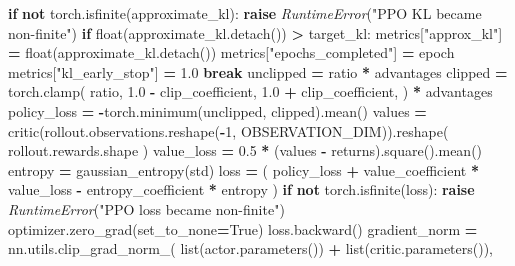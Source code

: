\documentclass[
  american,
  11pt,
  letterpaper,
]{article}
\newenvironment{Shaded}{\begin{snugshade}}{\end{snugshade}}
\newcommand{\BuiltInTok}[1]{#1}
\newcommand{\ControlFlowTok}[1]{\textcolor[rgb]{0.13,0.29,0.53}{\textbf{#1}}}
\newcommand{\DecValTok}[1]{\textcolor[rgb]{0.00,0.00,0.81}{#1}}
\newcommand{\FloatTok}[1]{\textcolor[rgb]{0.00,0.00,0.81}{#1}}
\newcommand{\KeywordTok}[1]{\textcolor[rgb]{0.13,0.29,0.53}{\textbf{#1}}}
\newcommand{\NormalTok}[1]{#1}
\newcommand{\OperatorTok}[1]{\textcolor[rgb]{0.81,0.36,0.00}{\textbf{#1}}}
\newcommand{\PreprocessorTok}[1]{\textcolor[rgb]{0.56,0.35,0.01}{\textit{#1}}}
\newcommand{\StringTok}[1]{\textcolor[rgb]{0.31,0.60,0.02}{#1}}
\newcommand{\VariableTok}[1]{\textcolor[rgb]{0.00,0.00,0.00}{#1}}
\newcounter{none} %
\renewenvironment{Shaded}{\par\smallskip}{\par\smallskip}
\begin{document}
\begin{Shaded}
\begin{Highlighting}[]
        \ControlFlowTok{if} \KeywordTok{not}\NormalTok{ torch.isfinite(approximate\_kl):}
            \ControlFlowTok{raise} \PreprocessorTok{RuntimeError}\NormalTok{(}\StringTok{"PPO KL became non{-}finite"}\NormalTok{)}
        \ControlFlowTok{if} \BuiltInTok{float}\NormalTok{(approximate\_kl.detach()) }\OperatorTok{\textgreater{}}\NormalTok{ target\_kl:}
\NormalTok{            metrics[}\StringTok{"approx\_kl"}\NormalTok{] }\OperatorTok{=} \BuiltInTok{float}\NormalTok{(approximate\_kl.detach())}
\NormalTok{            metrics[}\StringTok{"epochs\_completed"}\NormalTok{] }\OperatorTok{=}\NormalTok{ epoch}
\NormalTok{            metrics[}\StringTok{"kl\_early\_stop"}\NormalTok{] }\OperatorTok{=} \FloatTok{1.0}
            \ControlFlowTok{break}
\NormalTok{        unclipped }\OperatorTok{=}\NormalTok{ ratio }\OperatorTok{*}\NormalTok{ advantages}
\NormalTok{        clipped }\OperatorTok{=}\NormalTok{ torch.clamp(}
\NormalTok{            ratio,}
            \FloatTok{1.0} \OperatorTok{{-}}\NormalTok{ clip\_coefficient,}
            \FloatTok{1.0} \OperatorTok{+}\NormalTok{ clip\_coefficient,}
\NormalTok{        ) }\OperatorTok{*}\NormalTok{ advantages}
\NormalTok{        policy\_loss }\OperatorTok{=} \OperatorTok{{-}}\NormalTok{torch.minimum(unclipped, clipped).mean()}
\NormalTok{        values }\OperatorTok{=}\NormalTok{ critic(rollout.observations.reshape(}\OperatorTok{{-}}\DecValTok{1}\NormalTok{, OBSERVATION\_DIM)).reshape(}
\NormalTok{            rollout.rewards.shape}
\NormalTok{        )}
\NormalTok{        value\_loss }\OperatorTok{=} \FloatTok{0.5} \OperatorTok{*}\NormalTok{ (values }\OperatorTok{{-}}\NormalTok{ returns).square().mean()}
\NormalTok{        entropy }\OperatorTok{=}\NormalTok{ gaussian\_entropy(std)}
\NormalTok{        loss }\OperatorTok{=}\NormalTok{ (}
\NormalTok{            policy\_loss}
            \OperatorTok{+}\NormalTok{ value\_coefficient }\OperatorTok{*}\NormalTok{ value\_loss}
            \OperatorTok{{-}}\NormalTok{ entropy\_coefficient }\OperatorTok{*}\NormalTok{ entropy}
\NormalTok{        )}
        \ControlFlowTok{if} \KeywordTok{not}\NormalTok{ torch.isfinite(loss):}
            \ControlFlowTok{raise} \PreprocessorTok{RuntimeError}\NormalTok{(}\StringTok{"PPO loss became non{-}finite"}\NormalTok{)}
\NormalTok{        optimizer.zero\_grad(set\_to\_none}\OperatorTok{=}\VariableTok{True}\NormalTok{)}
\NormalTok{        loss.backward()}
\NormalTok{        gradient\_norm }\OperatorTok{=}\NormalTok{ nn.utils.clip\_grad\_norm\_(}
            \BuiltInTok{list}\NormalTok{(actor.parameters()) }\OperatorTok{+} \BuiltInTok{list}\NormalTok{(critic.parameters()),}

\end{Highlighting}
\end{Shaded}
\end{document}
